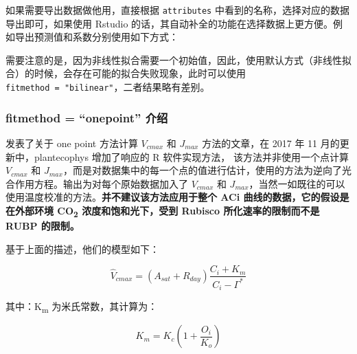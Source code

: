 \documentclass[]{krantz}
\makeatletter
\newenvironment{Shaded}{\begin{snugshade}}{\end{snugshade}}
\newcommand{\KeywordTok}[1]{\textcolor[rgb]{0.13,0.29,0.53}{\textbf{#1}}}
\newcommand{\DataTypeTok}[1]{\textcolor[rgb]{0.13,0.29,0.53}{#1}}
\newcommand{\StringTok}[1]{\textcolor[rgb]{0.31,0.60,0.02}{#1}}
\newcommand{\CommentTok}[1]{\textcolor[rgb]{0.56,0.35,0.01}{\textit{#1}}}
\newcommand{\OperatorTok}[1]{\textcolor[rgb]{0.81,0.36,0.00}{\textbf{#1}}}
\newcommand{\NormalTok}[1]{#1}
\renewenvironment{quote}{\begin{VF}}{\end{VF}}
\newenvironment{kframe}{%
\medskip{}
\setlength{\fboxsep}{.8em}
 \def\at@end@of@kframe{}%
 \ifinner\ifhmode%
  \def\at@end@of@kframe{\end{minipage}}%
  \begin{minipage}{\columnwidth}%
 \fi\fi%
 \def\FrameCommand##1{\hskip\@totalleftmargin \hskip-\fboxsep
 \colorbox{shadecolor}{##1}\hskip-\fboxsep
     \hskip-\linewidth \hskip-\@totalleftmargin \hskip\columnwidth}%
 \MakeFramed {\advance\hsize-\width
   \@totalleftmargin\z@ \linewidth\hsize
   \@setminipage}}%
 {\par\unskip\endMakeFramed%
 \at@end@of@kframe}
\renewenvironment{Shaded}{\begin{kframe}}{\end{kframe}}
\theoremstyle{definition}
\theoremstyle{definition}
\theoremstyle{definition}
\theoremstyle{remark}
\makeatother
\begin{document}
如果需要导出数据做他用，直接根据 \texttt{attributes}
中看到的名称，选择对应的数据导出即可，如果使用 Rstudio
的话，其自动补全的功能在选择数据上更方便。例如导出预测值和系数分别使用如下方式：

\begin{Shaded}
\end{Shaded}

\begin{quote}
需要注意的是，因为非线性拟合需要一个初始值，因此，使用默认方式（非线性拟合）的时候，会存在可能的拟合失败现象，此时可以使用
\texttt{fitmethod\ =\ "bilinear"}，二者结果略有差别。
\end{quote}

\subsubsection{\texorpdfstring{fitmethod = ``onepoint''
介绍}{fitmethod = onepoint 介绍}}\label{onepoint}

\citet{De2016A} 发表了关于 one point 方法计算 \(V_{cmax}\) 和
\(J_{max}\) 方法的文章，在 2017 年 11 月的更新中，plantecophys
增加了响应的 R 软件实现方法， 该方法并非使用一个点计算 \(V_{cmax}\) 和
\(J_{max}\)，而是对数据集中的每一个点的值进行估计，使用的方法为逆向了光合作用方程。输出为对每个原始数据加入了
\(V_{cmax}\) 和
\(J_{max}\)，当然一如既往的可以使用温度校准的方法。\textbf{并不建议该方法应用于整个
ACi 曲线的数据，它的假设是在外部环境 CO\textsubscript{2}
浓度和饱和光下，受到 Rubisco 所化速率的限制而不是 RUBP 的限制。}

基于上面的描述，他们的模型如下：

\begin{equation}
\hat{V}_{cmax} = (A_{sat} + R_{day}) \frac{C_i + K_m}{C_i - \Gamma^*} 
\label{eq:inverseA}
\end{equation}

其中：K\textsubscript{m} 为米氏常数，其计算为：

\begin{equation}
K_m = K_c (1 + \frac{O_i}{K_o}) 
\label{eq:km}
\end{equation}
\end{document}
